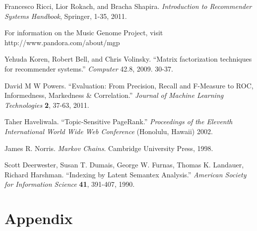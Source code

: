 \documentclass[11pt]{article}
\begin{document}
\begin{thebibliography}{9}

    Francesco Ricci, Lior Rokach, and Bracha Shapira.
    \emph{Introduction to Recommender Systems Handbook}, Springer, 1-35, 2011.

    For information on the Music Genome Project, visit
    http://www.pandora.com/about/mgp

    Yehuda Koren, Robert Bell, and Chris Volinsky.
    ``Matrix factorization techniques for recommender systems.''
    \emph{Computer} 42.8, 2009. 30-37.

    David M W Powers.
    ``Evaluation: From Precision, Recall and F-Measure to ROC, Informedness,
Markedness \& Correlation.''
    \emph{Journal of Machine Learning Technologies} \textbf{2}, 37-63, 2011.

    Taher Haveliwala.
    ``Topic-Sensitive PageRank.''
    \emph{Proceedings of the Eleventh International World Wide Web Conference}
(Honolulu, Hawaii) 2002.

    James R. Norris.
    \emph{Markov Chains}. Cambridge University Press, 1998.

    Scott Deerwester, Susan T. Dumais, George W. Furnas, Thomas K. Landauer,
Richard Harshman.
    ``Indexing by Latent Semantex Analysis.''
    \emph{American Society for Information Science} \textbf{41}, 391-407, 1990.

\end{thebibliography}

\section*{Appendix}
\end{document}
